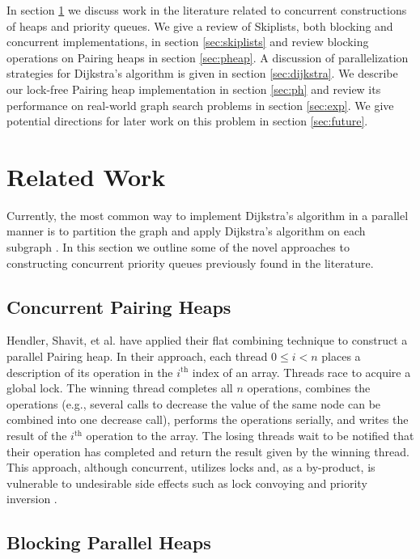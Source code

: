 \documentclass{acm_proc_article-sp}
\begin{document}
In section \ref{sec:related} we discuss work in the literature
related to concurrent constructions of heaps and priority queues.
We give a review of Skiplists, both blocking and concurrent implementations, in section \ref{sec:skiplists}
and review blocking operations on Pairing heaps in section \ref{sec:pheap}. A discussion of parallelization
strategies for Dijkstra's algorithm is given in section \ref{sec:dijkstra}. We
describe our lock-free Pairing heap implementation in section \ref{sec:ph} and review
its performance on real-world graph search problems in section \ref{sec:exp}.
We give potential directions for later work on this problem in section \ref{sec:future}.

\section{Related Work}
\label{sec:related}
Currently, the most common way to implement Dijkstra's algorithm in
a parallel manner is to partition the graph and apply
Dijkstra's algorithm on
each subgraph \cite{crauser98}. In this section we outline
some of the novel approaches to constructing concurrent priority queues
previously found in the literature.

\subsection{Concurrent Pairing Heaps}
Hendler, Shavit, et al. \cite{hendler10}
have applied their flat combining technique to construct
a parallel Pairing heap. In their approach, each thread $0 \leq i < n$
places a description of its operation in the $i^\mathrm{th}$ index of an array. Threads
race to acquire a global lock. The winning thread completes all $n$ operations, combines
the operations (e.g., several calls to decrease the value of the same node can be combined
into one decrease call), performs the operations serially, and writes the result of the $i^\mathrm{th}$
operation to the array. The losing threads wait to be notified that their operation has completed and return
the result given by the winning thread. This approach, although concurrent, utilizes locks and, as a by-product,
is vulnerable to undesirable side effects such as lock convoying and priority inversion \cite{kleiman96}.

\subsection{Blocking Parallel Heaps}
\end{document}
